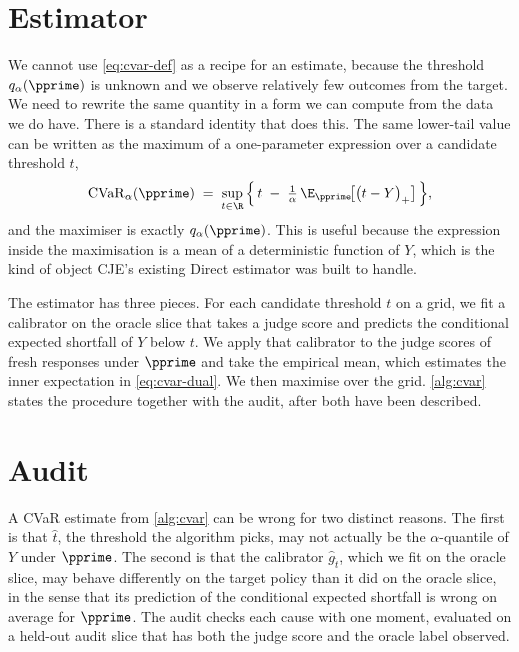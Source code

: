 \documentclass[11pt]{article}
\newcommand{\CJE}{\textsc{CJE}}
\newcommand{\CVaR}{\mathrm{CVaR}}
\newcommand{\stoploss}[2]{\bigl(#1 - #2\bigr)_{+}}
\begin{document}
\section{Estimator}

We cannot use \cref{eq:cvar-def} as a recipe for an estimate, because the threshold $q_\alpha(\pprime)$ is unknown and we observe relatively few outcomes from the target. We need to rewrite the same quantity in a form we can compute from the data we do have. There is a standard identity that does this. The same lower-tail value can be written as the maximum of a one-parameter expression over a candidate threshold $t$,
\begin{equation}\label{eq:cvar-dual}
\CVaR_\alpha(\pprime) \;=\; \sup_{t \in \R} \Big\{\, t \;-\; \tfrac{1}{\alpha}\, \E_{\pprime}\!\big[\stoploss{t}{Y}\big] \,\Big\},
\end{equation}
and the maximiser is exactly $q_\alpha(\pprime)$. This is useful because the expression inside the maximisation is a mean of a deterministic function of $Y$, which is the kind of object \CJE's existing Direct estimator was built to handle.

The estimator has three pieces. For each candidate threshold $t$ on a grid, we fit a calibrator on the oracle slice that takes a judge score and predicts the conditional expected shortfall of $Y$ below $t$. We apply that calibrator to the judge scores of fresh responses under $\pprime$ and take the empirical mean, which estimates the inner expectation in \cref{eq:cvar-dual}. We then maximise over the grid. \cref{alg:cvar} states the procedure together with the audit, after both have been described.

\section{Audit}

A CVaR estimate from \cref{alg:cvar} can be wrong for two distinct reasons. The first is that $\hat t$, the threshold the algorithm picks, may not actually be the $\alpha$-quantile of $Y$ under $\pprime$. The second is that the calibrator $\hat g_{\hat t}$, which we fit on the oracle slice, may behave differently on the target policy than it did on the oracle slice, in the sense that its prediction of the conditional expected shortfall is wrong on average for $\pprime$. The audit checks each cause with one moment, evaluated on a held-out audit slice that has both the judge score and the oracle label observed.
\end{document}

